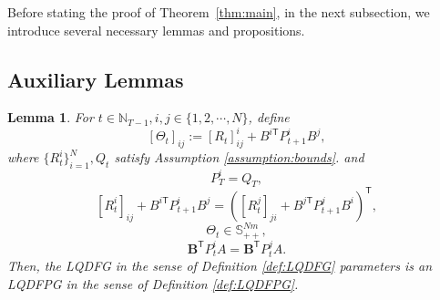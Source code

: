 \documentclass[letterpaper, 10 pt, conference]{ieeeconf}  %
\newcommand{\transpose}{\mathsf{T}}
\newtheorem{lemma}{Lemma}
\begin{document}






\appendix
Before stating the proof of Theorem~\ref{thm:main}, in the next subsection, we introduce several necessary lemmas and propositions. 
\subsection{Auxiliary Lemmas}
\begin{lemma}
    For $t\in \mathbb{N}_{T-1},i,j\in \{1,2,\cdots,N\}$,
    define
        \begin{equation}\label{eq:Theta}
        [\Theta_{t}]_{ij} := [R_{t}]^{i}_{ij} + B^{i\transpose}P_{t+1}^{i}B^{j},
        \end{equation}
    where $\{R_{t}^{i}\}_{i=1}^{N},Q_{t}$ satisfy Assumption \ref{assumption:bounds}. and
    \begin{equation}\label{eq:costFPDG4}
        P_{T}^{i} =Q_{T},
    \end{equation}
        \begin{equation}\label{eq:costFPDG1}
            [R_{t}^{i}]_{ij} + B^{i\transpose}P_{t+1}^{i}B^{j} = ([R_{t}^{j}]_{ji} + B^{j\transpose}P_{t+1}^{j}B^{i})^{\transpose},
        \end{equation}
        \begin{equation}\label{eq:costFPDG2}
            \Theta_{t} \in \mathbb{S}_{++}^{Nm},
        \end{equation}
        \begin{equation}\label{eq:costFPDG3}
        \mathbf{B}^{\transpose}P_{t}^{i}A=\mathbf{B}^{\transpose}P_{t}^{j}A.
        \end{equation}
    Then, the LQDFG in the sense of Definition \ref{def:LQDFG} parameters is an LQDFPG in the sense of Definition \ref{def:LQDFPG}.
\end{lemma}
\end{document}
